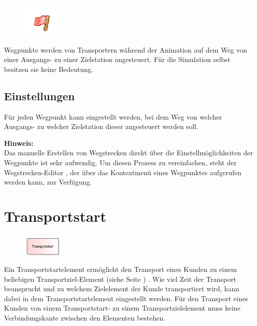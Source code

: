 \begin{figure}
\vspace{-22pt}
\includegraphics[width=2cm]{imageModelElementWayPoint.png}
\vspace{-22pt}
\end{figure}

Wegpunkte werden von Transportern während der Animation auf dem Weg von einer Ausgangs-
zu einer Zielstation angesteuert. Für die Simulation selbst besitzen sie keine Bedeutung.

\subsection*{Einstellungen}

Für jeden Wegpunkt kann eingestellt werden, bei dem Weg von welcher Ausgangs- zu welcher
Zielstation dieser angesteuert werden soll.

\textbf{Hinweis:}~\\
Das manuelle Erstellen von Wegstrecken direkt über die Einstellmöglichkeiten der
Wegpunkte ist sehr aufwendig. Um diesen Prozess zu vereinfachen, steht der
Wegstrecken-Editor , der über das Kontextmenü
eines Wegpunktes aufgerufen werden kann, zur Verfügung.


\section{Transportstart}
\label{ref:ModelElementTransportSource}

\begin{figure}
\vspace{-22pt}
\includegraphics[width=2cm]{imageModelElementTransportSource.png}
\vspace{-22pt}
\end{figure}

Ein Transportstartelement ermöglicht den Transport eines Kunden zu einem beliebigen
Transportziel-Element (siehe Seite \pageref{ref:ModelElementTransportDestination}) . Wie viel
Zeit der Transport beansprucht und zu welchem Zielelement der Kunde transportiert
wird, kann dabei in dem Transportstartelement eingestellt werden.
Für den Transport eines Kunden von einem Transportstart- zu einem Transportzielelement
muss keine Verbindungskante zwischen den Elementen bestehen.

